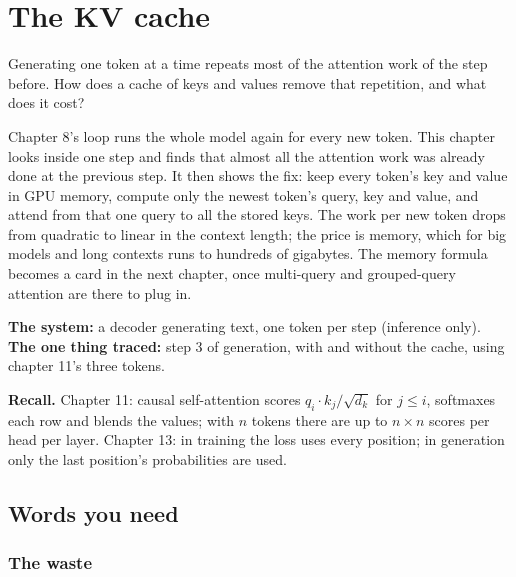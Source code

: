 \chapter{The KV cache}
\label{ch:kv}

\begin{question}
Generating one token at a time repeats most of the attention work of the step before. How does a cache of keys and values remove that repetition, and what does it cost?
\end{question}

\begin{whatfor}
Chapter 8's loop runs the whole model again for every new token. This chapter looks inside one step and finds that almost all the attention work was already done at the previous step. It then shows the fix: keep every token's key and value in GPU memory, compute only the newest token's query, key and value, and attend from that one query to all the stored keys. The work per new token drops from quadratic to linear in the context length; the price is memory, which for big models and long contexts runs to hundreds of gigabytes. The memory formula becomes a card in the next chapter, once multi-query and grouped-query attention are there to plug in.
\end{whatfor}

\begin{setup}
\textbf{The system:} a decoder generating text, one token per step (inference only).
\textbf{The one thing traced:} step 3 of generation, with and without the cache, using chapter 11's three tokens.
\end{setup}

\begin{recall}
\textbf{Recall.} Chapter 11: causal self-attention scores $q_i \cdot k_j/\sqrt{d_k}$ for $j \le i$, softmaxes each row and blends the values; with $n$ tokens there are up to $n \times n$ scores per head per layer. Chapter 13: in training the loss uses every position; in generation only the last position's probabilities are used.
\end{recall}

\section{Words you need}

\subsection*{The waste}

